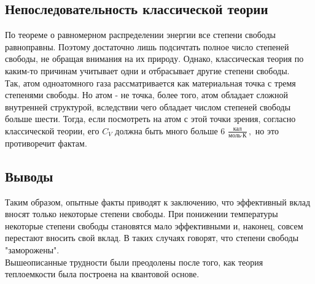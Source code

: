 \subsection {Непоследовательность классической теории}

По теореме о равномерном распределении энергии все степени свободы равноправны. Поэтому достаточно лишь подсичтать полное число степеней свободы, не обращая внимания на их природу. Однако, классическая теория по каким-то причинам учитывает одни и отбрасывает другие степени свободы. \\ [0.2cm]
Так, атом одноатомного газа рассматривается как материальная точка с тремя степенями свободы. Но атом - не точка, более того, атом обладает сложной внутренней структурой, вследствии чего обладает числом степеней свободы больше шести. Тогда, если посмотреть на атом с этой точки зрения, согласно классической теории, его $ C_V $ должна быть много больше 6 $ \frac {\texttt {кал}} {\texttt {моль} \cdot \texttt {К}} \, , $ но это противоречит фактам.

\subsection {Выводы}

Таким образом, опытные факты приводят к заключению, что эффективный вклад вносят только некоторые степени свободы. При понижении температуры некоторые степени свободы становятся мало эффективными и, наконец, совсем перестают вносить свой вклад. В таких случаях говорят, что степени свободы "заморожены". \\ [0.2cm]

Вышеописанные трудности были преодолены после того, как теория теплоемкости была построена на квантовой основе.

\newpage